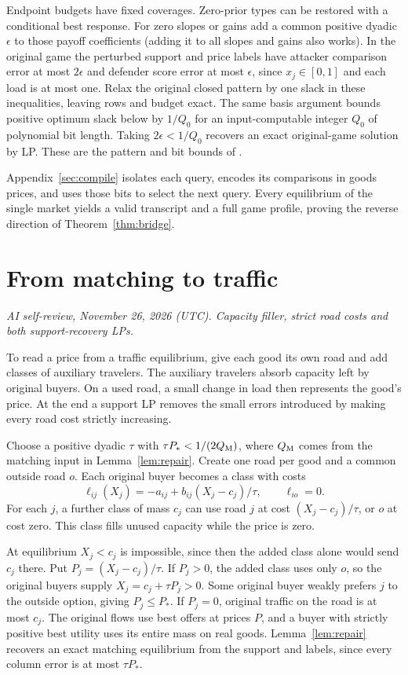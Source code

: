 \documentclass[11pt,oneside,openany,notitlepage]{report}
\newcommand{\reviewdate}{November 26, 2026 (UTC)}
\newcommand{\reviewmark}[1]{\par\nopagebreak[4]\noindent
  {\footnotesize\itshape AI self-review, \reviewdate. #1\par}\nobreak\smallskip}
\begin{document}
Endpoint budgets have fixed coverages. Zero-prior types can be restored
with a conditional best response. For zero slopes or gains add a common
positive dyadic \(\epsilon\) to those payoff coefficients (adding it to
all slopes and gains also works). In the original game the perturbed
support and price labels have attacker comparison error at most
\(2\epsilon\) and defender score error at most \(\epsilon\), since
\(x_j\in[0,1]\) and each load is at most one. Relax the original closed
pattern by one slack in these inequalities, leaving rows and budget
exact. The same basis argument bounds positive optimum slack below by
\(1/Q_0\) for an input-computable integer \(Q_0\) of polynomial bit
length. Taking \(2\epsilon<1/Q_0\)
recovers an exact original-game solution by LP. These are the pattern
and bit bounds of \cite[Section~3.1]{book}.

Appendix~\ref{sec:compile} isolates each query, encodes its comparisons
in goods prices, and uses those bits to select the next query. Every
equilibrium of the single market yields a valid transcript and a full game
profile, proving the reverse direction of Theorem~\ref{thm:bridge}.

\chapter{From matching to traffic}\label{sec:forward}
\reviewmark{Capacity filler, strict road costs and both support-recovery LPs.}

To read a price from a traffic equilibrium, give each good its own road
and add classes of auxiliary travelers. The auxiliary travelers absorb
capacity left by original buyers. On a used road, a small change in load
then represents the good's price. At the end a support LP removes the
small errors introduced by making every road cost strictly increasing.

Choose a positive dyadic \(\tau\) with \(\tau P_*<1/(2Q_{\rm M})\),
where \(Q_{\rm M}\) comes from the matching input in Lemma~\ref{lem:repair}.
Create one road per good and a common outside road \(o\). Each original
buyer becomes a class with costs
\[
 \ell_{ij}(X_j)=-a_{ij}+b_{ij}(X_j-c_j)/\tau,\qquad \ell_{io}=0 .
\]
For each \(j\), a further class of mass \(c_j\) can use road \(j\) at cost
\((X_j-c_j)/\tau\), or \(o\) at cost zero. This class fills unused capacity
while the price is zero.

At equilibrium \(X_j<c_j\) is impossible, since then the added class alone
would send \(c_j\) there. Put \(P_j=(X_j-c_j)/\tau\). If \(P_j>0\), the
added class uses only \(o\), so the original buyers supply
\(X_j=c_j+\tau P_j>0\). Some original buyer weakly prefers \(j\) to the
outside option, giving \(P_j\le P_*\). If \(P_j=0\), original traffic on
the road is at most \(c_j\). The original flows use best offers at prices
\(P\), and a buyer with strictly positive best utility uses its entire mass
on real goods. Lemma~\ref{lem:repair} recovers an exact matching equilibrium
from the support and labels, since every column error is at most \(\tau P_*\).
\end{document}
